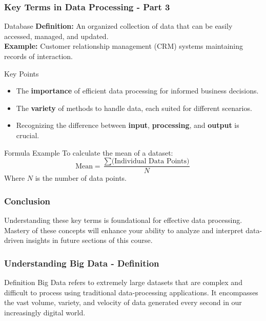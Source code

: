 \documentclass[aspectratio=169]{beamer}
\begin{document}
\begin{frame}[fragile]
    \frametitle{Key Terms in Data Processing - Part 3}
    \begin{block}{Database}
        \textbf{Definition:} An organized collection of data that can be easily accessed, managed, and updated.\\
        \textbf{Example:} Customer relationship management (CRM) systems maintaining records of interaction.
    \end{block}

    \begin{block}{Key Points}
        \begin{itemize}
            \item The \textbf{importance} of efficient data processing for informed business decisions.
            \item The \textbf{variety} of methods to handle data, each suited for different scenarios.
            \item Recognizing the difference between \textbf{input}, \textbf{processing}, and \textbf{output} is crucial.
        \end{itemize}
    \end{block}
    
    \begin{block}{Formula Example}
        To calculate the mean of a dataset:
        \begin{equation}
        \text{Mean} = \frac{\sum \text{(Individual Data Points)}}{N}
        \end{equation}
        Where \(N\) is the number of data points.
    \end{block}
\end{frame}

\begin{frame}[fragile]
    \frametitle{Conclusion}
    Understanding these key terms is foundational for effective data processing. Mastery of these concepts will enhance your ability to analyze and interpret data-driven insights in future sections of this course.
\end{frame}

\begin{frame}[fragile]
    \frametitle{Understanding Big Data - Definition}
    \begin{block}{Definition}
        Big Data refers to extremely large datasets that are complex and difficult to process using traditional data-processing applications. It encompasses the vast volume, variety, and velocity of data generated every second in our increasingly digital world.
    \end{block}
\end{frame}
\end{document}
